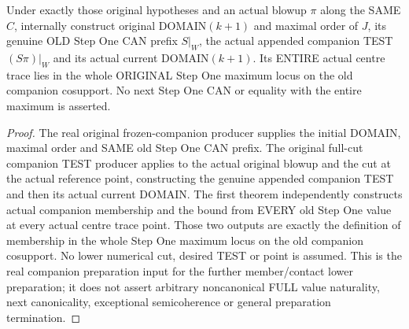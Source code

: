 \begin{theorem}
\label{hir:original-full-cut-genuine-companion-stepone-preparation}
\leanok
Under exactly those original hypotheses and an actual blowup $\pi$ along the
SAME $C$, internally construct original DOMAIN$(k+1)$ and maximal order of
$J$, its genuine OLD Step One CAN prefix $S|_W$, the actual appended companion
TEST $(S\pi)|_W$ and its actual current DOMAIN$(k+1)$. Its ENTIRE actual
centre trace lies in the whole ORIGINAL Step One maximum locus on the
old companion cosupport. No next Step One CAN or equality with the entire
maximum is asserted.
\end{theorem}
\begin{proof}
The real original frozen-companion producer supplies the initial DOMAIN,
maximal order and SAME old Step One CAN prefix. The original full-cut
companion TEST producer applies to the actual original blowup and the cut
at the actual reference point, constructing the genuine appended companion
TEST and then its actual current DOMAIN. The first theorem independently
constructs actual companion membership and the bound from EVERY old Step
One value at every actual centre trace point. Those two outputs are exactly
the definition of membership in the whole Step One maximum locus on the
old companion cosupport. No lower numerical cut, desired TEST or point is
assumed. This is the real companion preparation input for the further
member/contact lower preparation; it does not assert arbitrary noncanonical
FULL value naturality, next canonicality, exceptional semicoherence or
general preparation termination.
\end{proof}
